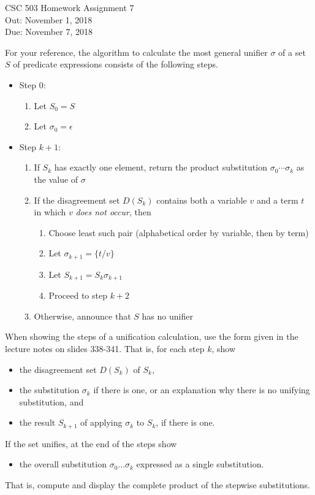 \documentclass{article}
\begin{document}
\begin{center}
  {\LARGE CSC 503 Homework Assignment 7}\\
  Out: November 1, 2018 \\
  Due: November 7, 2018 \\
\end{center}

\indent
For your reference, the algorithm to calculate the most general
unifier $\sigma$ of a set $S$ of predicate expressions consists of the
following steps.
\begin{itemize}

\item Step 0:
  \begin{enumerate}
  \item Let $S_0 = S$
  \item Let $\sigma_0 = \epsilon$
  \end{enumerate}

\item Step $k+1$:
  \begin{enumerate}
  \item If $S_k$ has exactly one element, return the product
    substitution $\sigma_0\cdots\sigma_k$ as the value of $\sigma$
  \item If the disagreement set $D(S_k)$ contains both a variable
    $v$ and a term $t$ in which $v$ \emph{does not occur}, then
    \begin{enumerate}
    \item Choose least such pair (alphabetical order by variable, then
      by term)
    \item Let $\sigma_{k+1} = \{ t/v \}$
    \item Let $S_{k+1} = S_k \sigma_{k+1}$
    \item Proceed to step $k+2$
    \end{enumerate}
  \item Otherwise, announce that $S$ has no unifier
  \end{enumerate}
\end{itemize}
When showing the steps of a unification calculation, use the form
given in the lecture notes on slides 338-341.  That is, for each step
$k$, show
\begin{itemize}
\item the disagreement set $D(S_k)$ of $S_k$,
\item the substitution $\sigma_k$ if there is one, or an explanation
  why there is no unifying substitution, and
\item the result $S_{k+1}$ of applying $\sigma_k$ to $S_k$, if there
  is one.
\end{itemize}
If the set unifies, at the end of the steps show
\begin{itemize}
\item the overall substitution $\sigma_0 \dots \sigma_k$ expressed as
  a single substitution.
\end{itemize}
That is, compute and display the complete product of the stepwise
substitutions.
\end{document}
